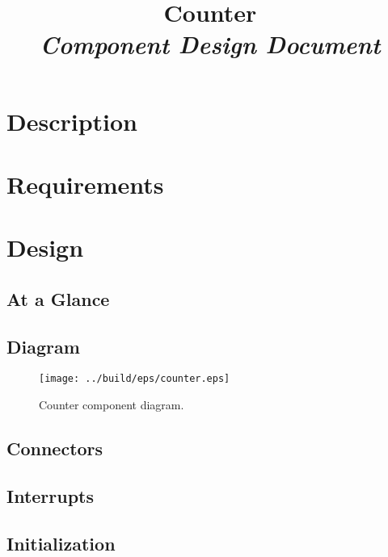 



\title{\textbf{Counter} \\
\large\textit{Component Design Document}}
\date{}
\maketitle

\section{Description}


\section{Requirements}


\section{Design}

\subsection{At a Glance}


\subsection{Diagram}
\begin{figure}[H]
  \texttt{[image: ../build/eps/counter.eps]}
  \caption{Counter component diagram.}
\end{figure}

\subsection{Connectors}


\subsection{Interrupts}



\subsection{Initialization}


